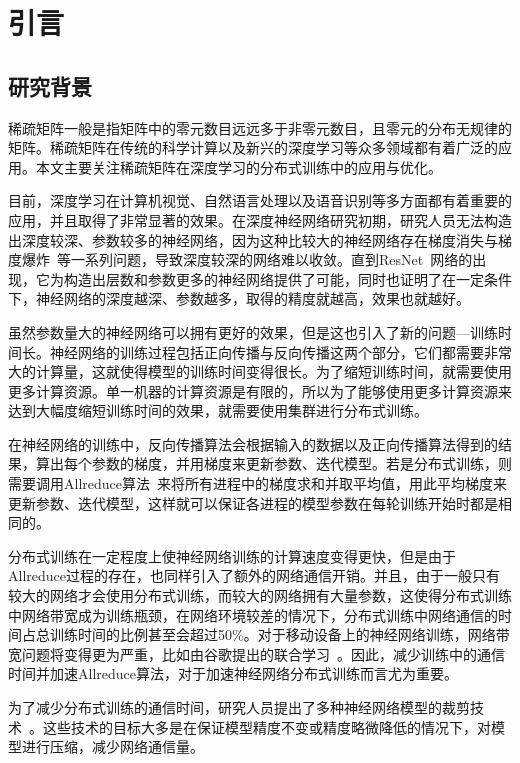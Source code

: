 \chapter{引言}
\label{chap1}

\section{研究背景}
稀疏矩阵一般是指矩阵中的零元数目远远多于非零元数目，且零元的分布无规律的矩阵。稀疏矩阵在传统的科学计算以及新兴的深度学习等众多领域都有着广泛的应用。本文主要关注稀疏矩阵在深度学习的分布式训练中的应用与优化。

目前，深度学习在计算机视觉、自然语言处理以及语音识别等多方面都有着重要的应用，并且取得了非常显著的效果。在深度神经网络研究初期，研究人员无法构造出深度较深、参数较多的神经网络，因为这种比较大的神经网络存在梯度消失与梯度爆炸~\cite{bengio1994learning, glorot2010understanding}等一系列问题，导致深度较深的网络难以收敛。直到ResNet~\cite{he2016deep}网络的出现，它为构造出层数和参数更多的神经网络提供了可能，同时也证明了在一定条件下，神经网络的深度越深、参数越多，取得的精度就越高，效果也就越好。

虽然参数量大的神经网络可以拥有更好的效果，但是这也引入了新的问题---训练时间长。神经网络的训练过程包括正向传播与反向传播这两个部分，它们都需要非常大的计算量，这就使得模型的训练时间变得很长。为了缩短训练时间，就需要使用更多计算资源。单一机器的计算资源是有限的，所以为了能够使用更多计算资源来达到大幅度缩短训练时间的效果，就需要使用集群进行分布式训练。

在神经网络的训练中，反向传播算法会根据输入的数据以及正向传播算法得到的结果，算出每个参数的梯度，并用梯度来更新参数、迭代模型。若是分布式训练，则需要调用Allreduce算法~\cite{rabenseifner2004optimization,bruck1997efficient}来将所有进程中的梯度求和并取平均值，用此平均梯度来更新参数、迭代模型，这样就可以保证各进程的模型参数在每轮训练开始时都是相同的。

分布式训练在一定程度上使神经网络训练的计算速度变得更快，但是由于Allreduce过程的存在，也同样引入了额外的网络通信开销。并且，由于一般只有较大的网络才会使用分布式训练，而较大的网络拥有大量参数，这使得分布式训练中网络带宽成为训练瓶颈，在网络环境较差的情况下，分布式训练中网络通信的时间占总训练时间的比例甚至会超过50\%。对于移动设备上的神经网络训练，网络带宽问题将变得更为严重，比如由谷歌提出的联合学习~\cite{federatedLearning}。因此，减少训练中的通信时间并加速Allreduce算法，对于加速神经网络分布式训练而言尤为重要。

为了减少分布式训练的通信时间，研究人员提出了多种神经网络模型的裁剪技术~\cite{strom2015scalable, han2015deep, lin2017deep}。这些技术的目标大多是在保证模型精度不变或精度略微降低的情况下，对模型进行压缩，减少网络通信量。

